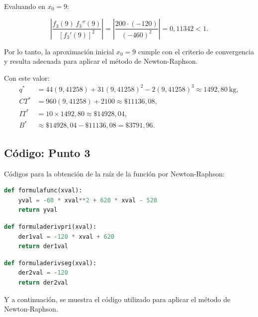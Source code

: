Evaluando en $x_0 = 9$:

\begin{equation}
    \left|
    \frac{f_3(9)\,f_3''(9)}
    {[f_3'(9)]^2}
    \right|
    =
    \left|
    \frac{200 \cdot (-120)}
    {(-460)^2}
    \right|
    =
    0{,}11342 < 1.
\end{equation}

Por lo tanto, la aproximación inicial $x_0 = 9$ cumple con el criterio de convergencia y resulta adecuada para aplicar el método de Newton-Raphson.


Con este valor:
\begin{align}
    q^* &= 44(9{,}41258) + 31(9{,}41258)^2 - 2(9{,}41258)^3
    \approx 1492{,}80\ \text{kg}, \\[4pt]
    CT^* &= 960(9{,}41258) + 2100
    \approx \$11136{,}08, \\[4pt]
    IT^* &= 10 \times 1492{,}80
    \approx \$14928{,}04, \\[4pt]
    \boxed{B^*} &\boxed{{}\approx \$14928{,}04 - \$11136{,}08
    = \$3791{,}96.}
\end{align}

\subsection{Código: Punto 3}

Códigos para la obtención de la raíz de la función por Newton-Raphson:

\begin{lstlisting}[language=Python,frame=single,caption=Función cuya raíz desea calcularse,label={cod:funcbeneficio}]
def formulafunc(xval):
    yval = -60 * xval**2 + 620 * xval - 520
    return yval
\end{lstlisting}

\begin{lstlisting}[language=Python,frame=single,caption=Derivada primera de la función,label={cod:der1beneficio}]
def formuladerivpri(xval):
    der1val = -120 * xval + 620
    return der1val
\end{lstlisting}

\begin{lstlisting}[language=Python,frame=single,caption=Derivada segunda de la función,label={cod:der2beneficio}]
def formuladerivseg(xval):
    der2val = -120
    return der2val
\end{lstlisting}

Y a continuación, se muestra el código utilizado para aplicar el método de Newton-Raphson.

